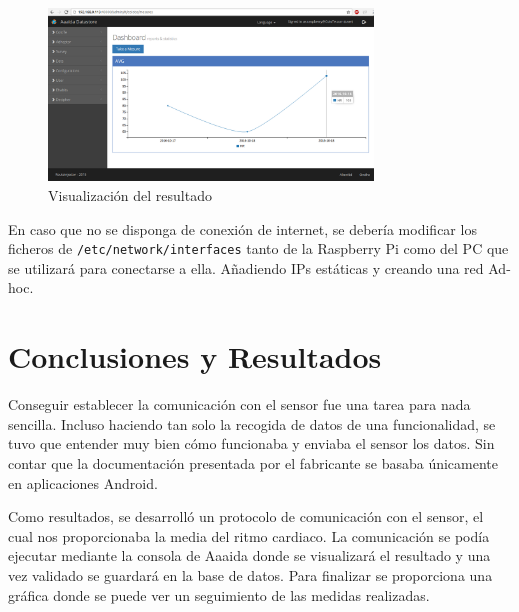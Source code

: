 \begin{figure}[htb]
\begin{center}
\includegraphics[width=0.77\textwidth]{./setup/conect2}
\caption{Visualización del resultado}
\end{center}
\end{figure}

En caso que no se disponga de conexión de internet, se debería modificar los ficheros de \texttt{/etc/network/interfaces} tanto de la Raspberry Pi como del PC que se utilizará para conectarse a ella. Añadiendo IPs estáticas y creando una red Ad-hoc. 


\section{Conclusiones y Resultados}

Conseguir establecer la comunicación con el sensor fue una tarea para nada sencilla. Incluso haciendo tan solo la recogida de datos de una funcionalidad, se tuvo que entender muy bien cómo funcionaba y enviaba el sensor los datos. Sin contar que la documentación presentada por el fabricante se basaba únicamente en aplicaciones Android. 

Como resultados, se desarrolló un protocolo de comunicación con el sensor, el cual nos proporcionaba la media  del ritmo cardiaco. La comunicación se podía ejecutar mediante la consola de Aaaida donde se visualizará el resultado y una vez validado se guardará en la base de datos. Para finalizar se proporciona una gráfica donde se puede ver un seguimiento de las medidas realizadas. 


